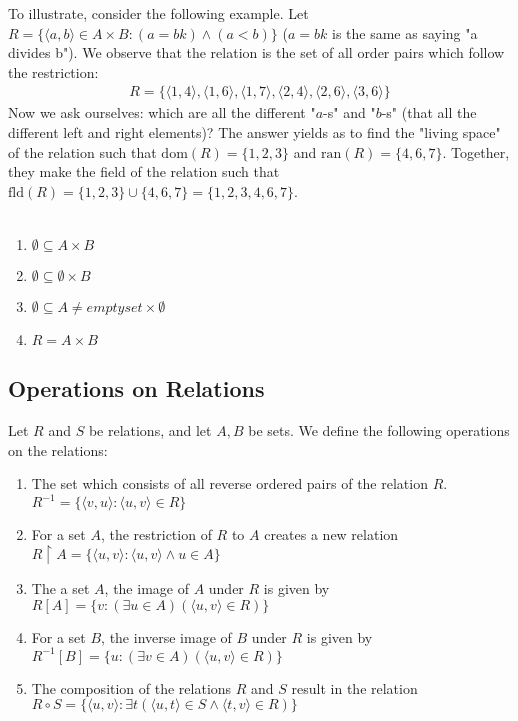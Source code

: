 \documentclass{tufte-handout} %
\theoremstyle{definition}
\theoremstyle{remark}
\begin{document}
To illustrate, consider the following example. Let $R = \{\langle a,b \rangle \in A \times B: (a=bk) \land (a<b)\}$ ($a=bk$ is the same as saying "a divides b"). We observe that the relation is the set of all order pairs which follow the restriction:
\begin{align*}
    R = \{\langle 1,4 \rangle, \langle 1,6 \rangle, \langle 1,7 \rangle, \langle 2,4 \rangle, \langle 2,6 \rangle, \langle 3,6 \rangle\}
\end{align*}
Now we ask ourselves: which are all the different "$a$-s" and "$b$-s" (that all the different left and right elements)? The answer yields as to find the "living space" of the relation such that $\mathrm{dom}(R)=\{1,2,3\}$ and $\mathrm{ran}(R)=\{4,6,7\}$. Together, they make the field of the relation such that $\mathrm{fld}(R) = \{1,2,3\} \cup \{4,6,7\} = \{1,2,3,4,6,7\}$.
\\\\
\begin{enumerate}
    \item $\emptyset \subseteq A \times B$ 
    \item $\emptyset \subseteq \emptyset \times B$
    \item $\emptyset \subseteq A\neq emptyset \times \emptyset$
    \item $R=A\times B$
\end{enumerate}
\subsection{Operations on Relations}
Let $R$ and $S$ be relations, and let $A,B$ be sets. We define the following operations on the relations:
\begin{enumerate}
    \item The set which consists of all reverse ordered pairs of the relation $R$. \\
    $R^{-1} = \{\langle v,u \rangle: \langle u,v \rangle \in R\}$
    \item For a set $A$, the restriction of $R$ to $A$ creates a new relation \\
    $R\upharpoonright A = \{\langle u,v \rangle: \langle u,v \rangle \land u \in A\}$
    \item The a set $A$, the image of $A$ under $R$ is given by \\
    $R[A] = \{v: (\exists u \in A)(\langle u,v \rangle \in R)\}$
    \item For a set $B$, the inverse image of $B$ under $R$ is given by \\
    $R^{-1}[B] = \{u: (\exists v \in A)(\langle u,v \rangle \in R)\}$
    \item The composition of the relations $R$ and $S$ result in the relation \\
    $R \circ S = \{\langle u,v \rangle: \exists t(\langle u,t \rangle \in S \land \langle t,v \rangle \in R)\}$ 
\end{enumerate}
\end{document}
